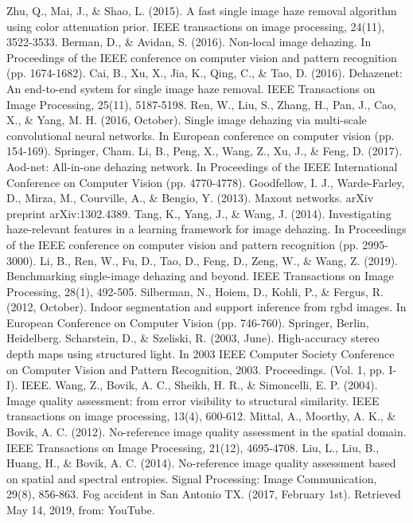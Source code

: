 \documentclass[a4paper, 12pt, oneside]{report}
\begin{document}
\begin{thebibliography}{99}
 Zhu, Q., Mai, J., \& Shao, L. (2015). A fast single image haze removal algorithm using color attenuation prior. IEEE transactions on image processing, 24(11), 3522-3533.
 Berman, D., \& Avidan, S. (2016). Non-local image dehazing. In Proceedings of the IEEE conference on computer vision and pattern recognition (pp. 1674-1682).
 Cai, B., Xu, X., Jia, K., Qing, C., \& Tao, D. (2016). Dehazenet: An end-to-end system for single image haze removal. IEEE Transactions on Image Processing, 25(11), 5187-5198.
 Ren, W., Liu, S., Zhang, H., Pan, J., Cao, X., \& Yang, M. H. (2016, October). Single image dehazing via multi-scale convolutional neural networks. In European conference on computer vision (pp. 154-169). Springer, Cham.
 Li, B., Peng, X., Wang, Z., Xu, J., \& Feng, D. (2017). Aod-net: All-in-one dehazing network. In Proceedings of the IEEE International Conference on Computer Vision (pp. 4770-4778).
 Goodfellow, I. J., Warde-Farley, D., Mirza, M., Courville, A., \& Bengio, Y. (2013). Maxout networks. arXiv preprint arXiv:1302.4389.
 Tang, K., Yang, J., \& Wang, J. (2014). Investigating haze-relevant features in a learning framework for image dehazing. In Proceedings of the IEEE conference on computer vision and pattern recognition (pp. 2995-3000).
 Li, B., Ren, W., Fu, D., Tao, D., Feng, D., Zeng, W., \& Wang, Z. (2019). Benchmarking single-image dehazing and beyond. IEEE Transactions on Image Processing, 28(1), 492-505.
 Silberman, N., Hoiem, D., Kohli, P., \& Fergus, R. (2012, October). Indoor segmentation and support inference from rgbd images. In European Conference on Computer Vision (pp. 746-760). Springer, Berlin, Heidelberg.
 Scharstein, D., \& Szeliski, R. (2003, June). High-accuracy stereo depth maps using structured light. In 2003 IEEE Computer Society Conference on Computer Vision and Pattern Recognition, 2003. Proceedings. (Vol. 1, pp. I-I). IEEE.
 Wang, Z., Bovik, A. C., Sheikh, H. R., \& Simoncelli, E. P. (2004). Image quality assessment: from error visibility to structural similarity. IEEE transactions on image processing, 13(4), 600-612.
 Mittal, A., Moorthy, A. K., \& Bovik, A. C. (2012). No-reference image quality assessment in the spatial domain. IEEE Transactions on Image Processing, 21(12), 4695-4708.
 Liu, L., Liu, B., Huang, H., \& Bovik, A. C. (2014). No-reference image quality assessment based on spatial and spectral entropies. Signal Processing: Image Communication, 29(8), 856-863.
 Fog accident in San Antonio TX. (2017, February 1st). Retrieved May 14, 2019, from: YouTube. 

\end{thebibliography}
\end{document}
